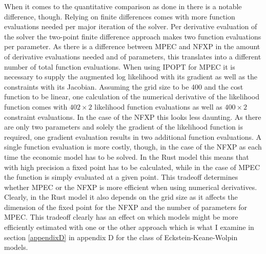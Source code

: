 When it comes to the quantitative comparison as done in \cite{Iskhakov.2016} there is a notable difference, though. Relying on finite differences comes with more function evaluations needed per major iteration of the solver. Per derivative evaluation of the solver the two-point finite difference approach makes two function evaluations per parameter. As there is a difference between MPEC and NFXP in the amount of derivative evaluations needed and of parameters, this translates into a different number of total function evaluations. When using IPOPT for MPEC it is necessary to supply the augmented log likelihood with its gradient as well as the constraints with its Jacobian. Assuming the grid size to be 400 and the cost function to be linear, one calculation of the numerical derivative of the likelihood function comes with $402 \times 2$ likelihood function evaluations as well as $400 \times 2$ constraint evaluations. In the case of the NFXP this looks less daunting. As there are only two parameters and solely the gradient of the likelihood function is required, one gradient evaluation results in two additional function evaluations. A single function evaluation is more costly, though, in the case of the NFXP as each time the economic model has to be solved. In the Rust model this means that with high precision a fixed point has to be calculated, while in the case of MPEC the function is simply evaluated at a given point. This tradeoff determines whether MPEC or the NFXP is more efficient when using numerical derivatives. Clearly, in the Rust model it also depends on the grid size as it affects the dimension of the fixed point for the NFXP and the number of parameters for MPEC. This tradeoff clearly has an effect on which models might be more efficiently estimated with one or the other approach which is what I examine in section \ref{appendixD} in appendix D for the class of Eckstein-Keane-Wolpin models.

